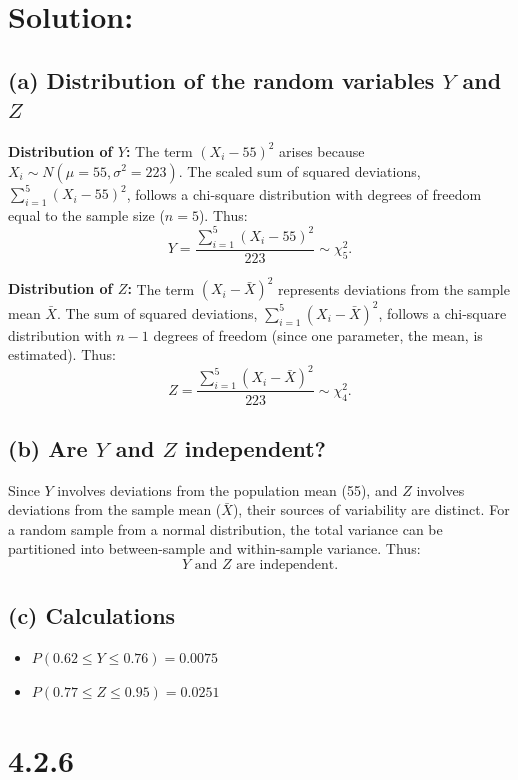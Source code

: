 \documentclass{article}
\begin{document}
\section*{Solution:}


\subsection*{(a) Distribution of the random variables $Y$ and $Z$}

\textbf{Distribution of $Y$:}  
The term $(X_i - 55)^2$ arises because $X_i \sim N(\mu = 55, \sigma^2 = 223)$.  
The scaled sum of squared deviations, $\sum_{i=1}^5 (X_i - 55)^2$, follows a chi-square distribution with degrees of freedom equal to the sample size ($n = 5$).  
Thus:
\[
Y = \frac{\sum_{i=1}^5 (X_i - 55)^2}{223} \sim \chi^2_5.
\]

\textbf{Distribution of $Z$:}  
The term $(X_i - \bar{X})^2$ represents deviations from the sample mean $\bar{X}$.  
The sum of squared deviations, $\sum_{i=1}^5 (X_i - \bar{X})^2$, follows a chi-square distribution with $n - 1$ degrees of freedom (since one parameter, the mean, is estimated).  
Thus:
\[
Z = \frac{\sum_{i=1}^5 (X_i - \bar{X})^2}{223} \sim \chi^2_4.
\]

\subsection*{(b) Are $Y$ and $Z$ independent?}

Since $Y$ involves deviations from the population mean (55), and $Z$ involves deviations from the sample mean ($\bar{X}$), their sources of variability are distinct.  
For a random sample from a normal distribution, the total variance can be partitioned into between-sample and within-sample variance.  
Thus:
\[
Y \text{ and } Z \text{ are independent.}
\]

\subsection*{(c) Calculations}

\begin{itemize}
    \item[(i)] $P(0.62 \leq Y \leq 0.76) = 0.0075$
    \item[(ii)] $P(0.77 \leq Z \leq 0.95) = 0.0251$
\end{itemize}


\section*{4.2.6}
\end{document}
